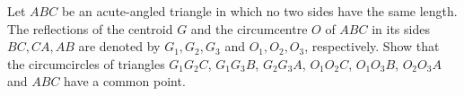 Let $ABC$ be an acute-angled triangle in which no two sides have the same length. The reflections of the centroid $G$ and the circumcentre $O$ of $ABC$ in its sides $BC,CA,AB$ are denoted by $G_1,G_2,G_3$ and $O_1,O_2,O_3$, respectively. Show that the circumcircles of triangles $G_1G_2C$, $G_1G_3B$, $G_2G_3A$, $O_1O_2C$, $O_1O_3B$, $O_2O_3A$ and $ABC$ have a common point. 
